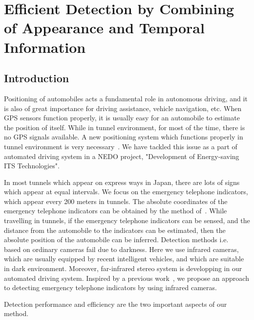 \chapter{Efficient Detection by Combining of Appearance and Temporal Information }

\section{Introduction}
Positioning of automobiles acts a fundamental role in autonomous driving, and it is also of great importance for driving assistance, vehicle navigation, etc. When GPS sensors function properly, it is usually easy for an automobile to estimate the position of  itself. While in tunnel environment, for most of the time, there is no GPS signals available. A new positioning system which functions properly in tunnel environment is very necessary~\cite{nig}. We have tackled this issue as a part of automated driving system in a NEDO project, "Development of Energy-saving ITS Technologies".

In most tunnels which appear on express ways in Japan, there are lots of signs which appear at equal intervals. We focus on the emergency telephone indicators, which appear every 200 meters in tunnels. The absolute coordinates of the emergency telephone indicators can be obtained by the method of~\cite{xue}. While travelling in tunnels, if the emergency telephone indicators can be sensed, and the distance from the automobile to the indicators can be estimated, then the absolute position of the automobile can be inferred. Detection methods i.e.~\cite{ac23} based on ordinary cameras fail due to darkness. Here we use infrared cameras, which are usually equipped by recent intelligent vehicles, and which are suitable in dark environment. Moreover, far-infrared stereo system is developping in our automated driving system. Inspired by a previous work~\cite{wang1}, we propose an approach to detecting emergency telephone indicators by using infrared cameras.

Detection performance and efficiency are the two important aspects of our method.

